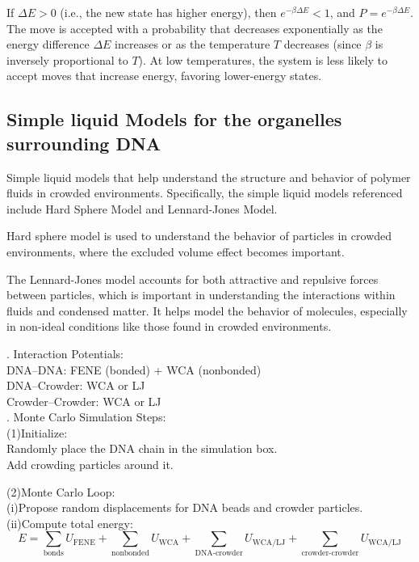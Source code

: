 \documentclass[12pt]{article}
\begin{document}
\begin{flushleft}
If $\Delta E > 0$ (i.e., the new state has higher energy), then $e^{-\beta \Delta E} < 1$, and $P = e^{-\beta \Delta E}$. The move is accepted with a probability that decreases exponentially as the energy difference $\Delta E$ increases or as the temperature $T$ decreases (since $\beta$ is inversely proportional to $T$). At low temperatures, the system is less likely to accept moves that increase energy, favoring lower-energy states.


\subsection*{Simple liquid Models for the organelles surrounding DNA}

Simple liquid models that help understand the structure and behavior of polymer fluids in crowded environments. Specifically, the simple liquid models referenced include Hard Sphere Model and Lennard-Jones Model. 


Hard sphere model is used to understand the behavior of particles in crowded environments, where the excluded volume effect becomes important. 


The Lennard-Jones model accounts for both attractive and repulsive forces between particles, which is important in understanding the interactions within fluids and condensed matter. It helps model the behavior of molecules, especially in non-ideal conditions like those found in crowded environments. 




. Interaction Potentials:\\
DNA–DNA: FENE (bonded) + WCA (nonbonded)\\
DNA–Crowder: WCA or LJ\\
Crowder–Crowder: WCA or LJ\\



. Monte Carlo Simulation Steps:\\
(1)Initialize:\\
\setlength{\parindent}{6em} Randomly place the DNA chain in the simulation box.\\
Add crowding particles around it.\\
\setlength{\parindent}{0em} 

\setlength{\parindent}{4em} (2)Monte Carlo Loop:\\
\setlength{\parindent}{6em}   (i)Propose random displacements for DNA beads and crowder particles.\\
   (ii)Compute total energy:
\begin{equation}
E = \sum_{\text{bonds}} U_{\mathrm{FENE}} + \sum_{\text{nonbonded}} U_{\mathrm{WCA}} 
+ \sum_{\text{DNA-crowder}} U_{\mathrm{WCA/LJ}} 
+ \sum_{\text{crowder-crowder}} U_{\mathrm{WCA/LJ}}
\end{equation}


\end{flushleft}
\end{document}
